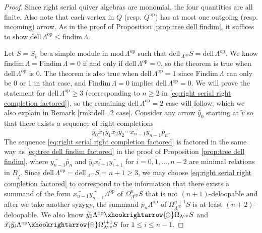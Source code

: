 \documentclass{conm-p-l}
\newcommand{\findim}{\mathrm{findim}\,}
\newcommand{\Findim}{\mathrm{Findim}\,}
\newcommand{\dell}{\mathrm{dell}\,}
\renewcommand{\dell}{\mathrm{dell}\,}
\newcommand{\op}{\mathrm{op}}
\renewcommand{\mod}{\mathrm{mod}\,}
\newcommand{\dirsum}{\xhookrightarrow{\!\oplus}}
\theoremstyle{definition}
\theoremstyle{remark}
\numberwithin{equation}{section}
\begin{document}
\begin{proof}
Since right serial quiver algebras are monomial, the four quantities are all finite. Also note that each vertex in $Q$ (resp. $Q^{\op}$) has at most one outgoing (resp. incoming) arrow. As in the proof of Proposition \ref{prop:tree dell findim}, it suffices to show $\dell\Lambda^{\op}\leq\findim\Lambda$. 

Let $S=S_{\tilde{v}}$ be a simple module in $\mod\Lambda^{\op}$ such that $\dell\!_{\Lambda^{\op}} S = \dell\Lambda^{\op}$. We know $\findim\Lambda=\Findim\Lambda=0$ if and only if $\dell\Lambda^{\op}=0$, so the theorem is true when $\dell\Lambda^{\op}$ is 0. The theorem is also true when $\dell\Lambda^{\op}=1$ since $\Findim\Lambda$ can only be 0 or 1 in that case, and $\Findim\Lambda=0$ implies $\dell\Lambda^{\op}=0$. We will prove the statement for $\dell\Lambda^{\op}\geq 3$ (corresponding to $n\geq 2$ in \eqref{eq:right serial right completion factored}), so the remaining $\dell\Lambda^{\op}=2$ case will follow, which we also explain in Remark \ref{rmk:dell=2 case}. Consider any arrow $\widetilde{y_0}$ starting at $\tilde{v}$ so that there exists a sequence of right completions
\begin{equation}
\label{eq:right serial right completion factored}
\widetilde{y_0}\widetilde{x_1}\widetilde{y_1}\widetilde{x_2}\widetilde{y_2} \cdots \widetilde{x_{n-1}}\widetilde{y_{n-1}}\widetilde{p_n}.
\end{equation}
The sequence \eqref{eq:right serial right completion factored} is factored in the same way as \eqref{eq:tree dell findim factored} in the proof of Proposition \ref{prop:tree dell findim}, where $\widetilde{y_{n-1}}\widetilde{p_n}$ and $\widetilde{y_i}\widetilde{x_{i+1}}\widetilde{y_{i+1}}$ for $i=0,1,\dots,n-2$ are minimal relations in $B_{\tilde{I}}$. Since $\dell\Lambda^{\op} = \dell_{\Lambda^{\op}} S = n+1 \geq 3$, we may choose \eqref{eq:right serial right completion factored} to correspond to the information that there exists a summand of the form $\widetilde{x_{n-1}}\widetilde{y_{n-1}}\Lambda^{\op}$ of $\Omega_{\Lambda^{\op}}^n S$ that is not $(n+1)$-deloopable and after we take another syzygy, the summand $\widetilde{p_n}\Lambda^{\op}$ of $\Omega_{\Lambda^{\op}}^{n+1} S$ is at least $(n+2)$-deloopable. We also know $\widetilde{y_0}\Lambda^{\op}\dirsum \Omega_{\Lambda^{\op}} S$ and $\widetilde{x_i}\widetilde{y_i}\Lambda^{\op}\dirsum \Omega_{\Lambda^{\op}}^{i+1} S$ for $1\leq i\leq n-1$.


\end{proof}
\end{document}

